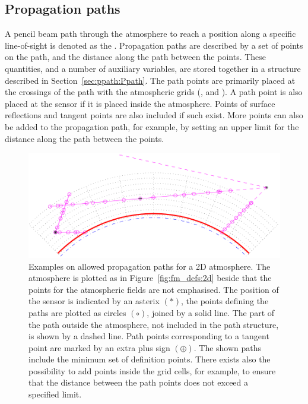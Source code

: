 \subsection{Propagation paths}
\label{sec:fm_defs:ppaths}

A pencil beam path through the atmosphere to reach a position along a
specific line-of-sight is denoted as the .
Propagation paths are described by a set of points on the path, and
the distance along the path between the points. These quantities, and
a number of auxiliary variables, are stored together in a structure
described in Section~\ref{sec:ppath:Ppath}. The path points are
primarily placed at the crossings of the path with the atmospheric
grids (,  and
). A path point is also placed at the sensor if
it is placed inside the atmosphere.  Points of surface reflections and
tangent points are also included if such exist. More points can also
be added to the propagation path, for example, by setting an upper
limit for the distance along the path between the points.

\begin{figure}[!p]
 \begin{center}
  \includegraphics*[width=0.95\hsize]{ppath_cases2}
  \caption{Examples on allowed propagation paths for a 2D atmosphere. 
    The atmosphere is plotted as in Figure~\ref{fig:fm_defs:2d} beside
    that the points for the atmospheric fields are not emphasised.
    The position of the sensor is indicated by an asterix $(\ast)$,
    the points defining the paths are plotted as circles $(\circ)$,
    joined by a solid line. The part of the path outside the
    atmosphere, not included in the path structure, is shown by a
    dashed line. Path points corresponding to a tangent point are
    marked by an extra plus sign $(\oplus)$. The shown paths include
    the minimum set of definition points. There exists also the
    possibility to add points inside the grid cells, for example, to
    ensure that the distance between the path points does not exceed
    a specified limit.}
  \label{fig:fm_defs:ppath_cases2}
 \end{center}
\end{figure}

